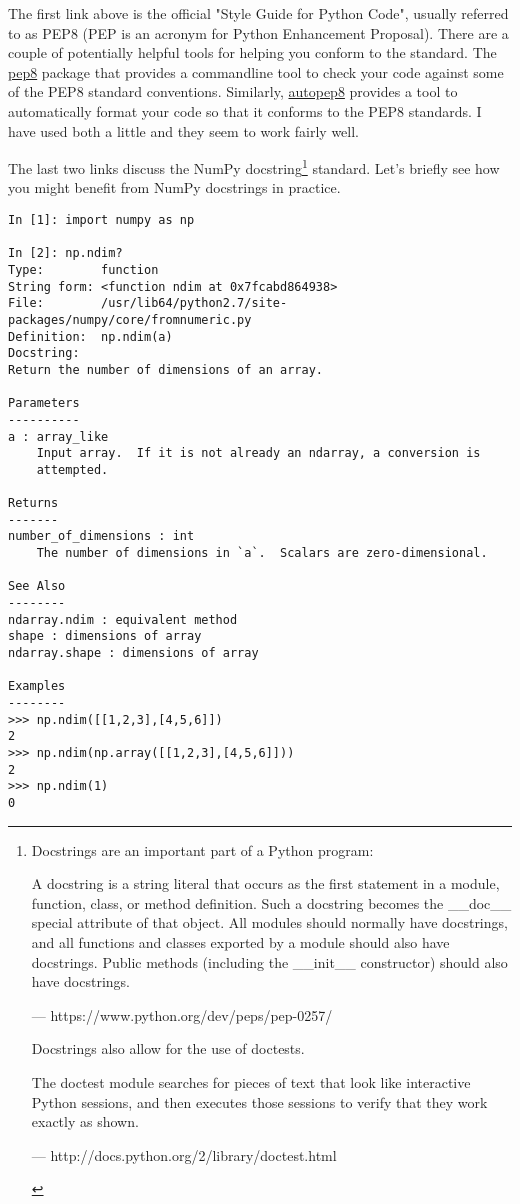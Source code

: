 The first link above is the official "Style Guide for Python Code", usually
referred to as PEP8 (PEP is an acronym for Python Enhancement Proposal).
There are a couple of potentially helpful tools for helping you conform
to the standard.  The \href{https://pypi.python.org/pypi/pep8}{pep8} package
that provides a commandline tool to check your code against some of the
PEP8 standard conventions.  Similarly, \href{https://pypi.python.org/pypi/autopep8}{autopep8}
provides a tool to automatically format your code so that it conforms to
the PEP8 standards. I have used both a little and they seem to work fairly
well.

The last two links discuss the NumPy docstring\footnote{Docstrings
are an important part of a Python program:
\begin{displayquote}
A docstring is a string literal that occurs as the first
statement in a module, function, class, or method definition.
Such a docstring becomes the \_\_doc\_\_ special attribute of
that object.
All modules should normally have docstrings, and all
functions and classes exported by a module should also
have docstrings. Public methods (including the \_\_init\_\_
constructor) should also have docstrings.

--- https://www.python.org/dev/peps/pep-0257/
\end{displayquote}
Docstrings also allow for the use of doctests.
\begin{displayquote}
The doctest module searches for pieces of text that look
like interactive Python sessions, and then executes those
sessions to verify that they work exactly as shown.

--- http://docs.python.org/2/library/doctest.html
\end{displayquote}
} standard. Let's briefly see how you might benefit from NumPy docstrings
in practice.

\begin{verbatim}
In [1]: import numpy as np

In [2]: np.ndim?
Type:        function
String form: <function ndim at 0x7fcabd864938>
File:        /usr/lib64/python2.7/site-packages/numpy/core/fromnumeric.py
Definition:  np.ndim(a)
Docstring:
Return the number of dimensions of an array.

Parameters
----------
a : array_like
    Input array.  If it is not already an ndarray, a conversion is
    attempted.

Returns
-------
number_of_dimensions : int
    The number of dimensions in `a`.  Scalars are zero-dimensional.

See Also
--------
ndarray.ndim : equivalent method
shape : dimensions of array
ndarray.shape : dimensions of array

Examples
--------
>>> np.ndim([[1,2,3],[4,5,6]])
2
>>> np.ndim(np.array([[1,2,3],[4,5,6]]))
2
>>> np.ndim(1)
0
\end{verbatim}

